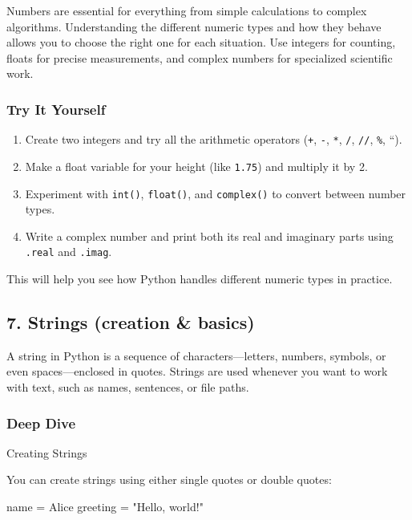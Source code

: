 \documentclass[
  letterpaper,
  DIV=11,
  numbers=noendperiod]{scrreprt}
\newenvironment{Shaded}{\begin{snugshade}}{\end{snugshade}}
\newcommand{\NormalTok}[1]{\textcolor[rgb]{0.00,0.23,0.31}{#1}}
\newcommand{\OperatorTok}[1]{\textcolor[rgb]{0.37,0.37,0.37}{#1}}
\newcommand{\StringTok}[1]{\textcolor[rgb]{0.13,0.47,0.30}{#1}}
\providecommand{\tightlist}{%
  \setlength{\itemsep}{0pt}\setlength{\parskip}{0pt}}
\begin{document}
Numbers are essential for everything from simple calculations to complex
algorithms. Understanding the different numeric types and how they
behave allows you to choose the right one for each situation. Use
integers for counting, floats for precise measurements, and complex
numbers for specialized scientific work.

\subsubsection{Try It Yourself}\label{try-it-yourself-6}

\begin{enumerate}
\def\labelenumi{\arabic{enumi}.}
\tightlist
\item
  Create two integers and try all the arithmetic operators (\texttt{+},
  \texttt{-}, \texttt{*}, \texttt{/}, \texttt{//}, \texttt{\%}, ``).
\item
  Make a float variable for your height (like \texttt{1.75}) and
  multiply it by 2.
\item
  Experiment with \texttt{int()}, \texttt{float()}, and
  \texttt{complex()} to convert between number types.
\item
  Write a complex number and print both its real and imaginary parts
  using \texttt{.real} and \texttt{.imag}.
\end{enumerate}

This will help you see how Python handles different numeric types in
practice.

\subsection{7. Strings (creation \&
basics)}\label{strings-creation-basics}

A string in Python is a sequence of characters---letters, numbers,
symbols, or even spaces---enclosed in quotes. Strings are used whenever
you want to work with text, such as names, sentences, or file paths.

\subsubsection{Deep Dive}\label{deep-dive-7}

Creating Strings

You can create strings using either single quotes or double quotes:

\begin{Shaded}
\begin{Highlighting}[]
\NormalTok{name }\OperatorTok{=} \StringTok{\textquotesingle{}Alice\textquotesingle{}}
\NormalTok{greeting }\OperatorTok{=} \StringTok{"Hello, world!"}
\end{Highlighting}
\end{Shaded}
\end{document}
